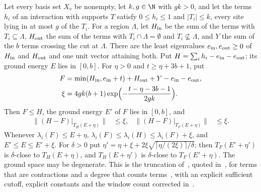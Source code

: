 \begin{theorem}
    \label{thm:lattice_region_hard_truncation_spectral_comparison}
    \leanok
    Let every basis set $X_v$ be nonempty, let $k,g\in\N$ with $gk>0$, and let
    the terms $h_i$ of an interaction with supports $T$ satisfy $0\le h_i\le1$
    and $|T_i|\le k$, every site lying in at most $g$ of the $T_i$. For a region
    $\Lambda$, let $H_{\rm in}$ be the sum of the terms with $T_i\subseteq\Lambda$,
    $H_{\rm out}$ the sum of the terms with $T_i\cap\Lambda=\emptyset$ and
    $T_i\not\subseteq\Lambda$, and $Y$ the sum of the $b$ terms crossing the cut
    at $\Lambda$. There are the least eigenvalues $e_{\rm in},e_{\rm out}\ge0$ of
    $H_{\rm in}$ and $H_{\rm out}$ and one unit vector attaining both. Put
    $H=\sum_ih_i-e_{\rm in}-e_{\rm out}$; its ground energy $E$ lies in $[0,b]$.
    For $\eta>0$ and $t\ge\eta+3b+1$, put
    \begin{align}
        F   & =\min(H_{\rm in},e_{\rm in}+t)+H_{\rm out}+Y-e_{\rm in}-e_{\rm out},\\
        \xi & =4gk(b+1)\exp\Bigl(-\frac{t-\eta-3b-1}{2gk}\Bigr).
    \end{align}
    Then $F\le H$, the ground energy $E'$ of $F$ lies in $[0,b]$, and
    \begin{align}
        \bigl\lVert(H-F)|_{T_H(E+\eta)}\bigr\rVert & \le\xi, &
        \bigl\lVert(H-F)|_{T_F(E+\eta)}\bigr\rVert & \le\xi.
    \end{align}
    Whenever $\lambda_i(F)\le E+\eta$,
    $\lambda_i(F)\le\lambda_i(H)\le\lambda_i(F)+\xi$, and $E'\le E\le E'+\xi$.
    For $\delta>0$ put
    $\eta'=\eta+\xi+2\xi\sqrt{\lceil\eta/(2\xi)\rceil/\delta}$; then
    $T_F(E'+\eta')$ is $\delta$-close to $T_H(E+\eta)$, and $T_H(E+\eta')$ is
    $\delta$-close to $T_F(E'+\eta)$. The ground space may be degenerate. This is
    the truncation of~\cite[Definition~2.5 and Theorem~2.6]{Arad2014Connecting},
    quoted in~\cite[Definition~4.3, Proposition~4.4 and
    Lemma~4.5]{Arad2016RigorousRG}, for terms that are contractions and a degree
    that counts terms~\cite{gap:akl14_hadamard_bound_scope}, with an explicit
    sufficient cutoff, explicit constants and the window count corrected
    in~\cite{gap:alvv16_hard_truncation_windows}.
\end{theorem}
